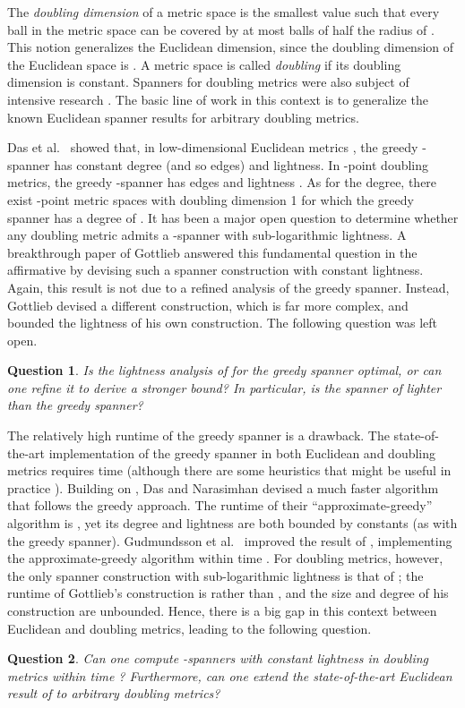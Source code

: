 \documentclass[11pt,letterpaper]{article}
\newtheorem{question}{Question}
\begin{document}
The \emph{doubling dimension} of a metric space  is the smallest value 
such that every ball  in the metric space can be covered by at most
 balls of half the radius of .
This notion generalizes the Euclidean dimension, since the doubling dimension
of the Euclidean space  is .
A metric space is called \emph{doubling} if its doubling dimension is constant.
Spanners for doubling metrics were also subject of intensive research  \cite{GGN04,CGMZ16,CG09,HM06,Roditty12,GR081,GR082,Smid09,ES15,Sol14}.
The basic line of work in this context is to generalize the known Euclidean spanner results for arbitrary doubling metrics.

Das et al.\ \cite{DHN93} showed that, in low-dimensional Euclidean metrics , the greedy -spanner has constant degree (and so  edges)
and  lightness.
In -point doubling metrics, the greedy -spanner has  edges and lightness  \cite{Smid09}.
As for the degree, there exist -point metric spaces with doubling dimension 1 for which the greedy spanner has a degree of  \cite{HM06,Smid09}.
It has been a major open question to determine whether any doubling metric admits
a -spanner  with sub-logarithmic lightness.
A breakthrough paper of Gottlieb \cite{Got15} answered this fundamental question in the affirmative by devising such a spanner construction with constant lightness.
Again, this result is not due to a refined analysis of the greedy spanner. Instead, Gottlieb devised a different construction,
which is far more complex, and bounded the lightness of his own construction. The following question was left open.
\begin{question} \label{question2}
	Is the lightness analysis of \cite{Smid09} for the greedy spanner optimal, or can one refine it to derive a stronger bound?
	In particular, is the spanner of \cite{Got15} lighter than the greedy spanner?
\end{question}

The relatively high runtime of the greedy spanner is a drawback.
The state-of-the-art implementation of the greedy spanner in both Euclidean and doubling metrics requires time  \cite{BCFMS10} (although there are some heuristics that might be useful in practice \cite{ABBB15,ABBB17}).
Building on \cite{DHN93}, Das and Narasimhan \cite{DN97} devised a much faster algorithm that follows the greedy approach.
The runtime of their ``approximate-greedy'' algorithm is , yet its degree and lightness are both bounded by constants (as with the greedy spanner).
Gudmundsson et al.\ \cite{GLN02} improved the result of \cite{DN97}, implementing the approximate-greedy algorithm within time .
For doubling metrics, however, the only spanner construction with sub-logarithmic lightness is that of   \cite{Got15};
the runtime of Gottlieb's construction is  rather than , and the size and degree of his construction are unbounded.
Hence, there is a big gap in this context between Euclidean and doubling metrics, leading to the following question.
\begin{question} \label{question3}
	Can one compute -spanners with constant lightness in doubling metrics  within time ?
	Furthermore, can one extend the state-of-the-art Euclidean result of \cite{GLN02} to arbitrary doubling metrics?
\end{question}	
\end{document}
